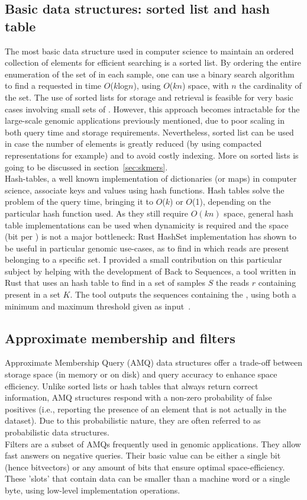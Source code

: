 \subsection{Basic data structures: sorted list and hash table}
The most basic data structure used in computer science to maintain an ordered collection of elements for efficient searching is a sorted list. By ordering the entire enumeration of the set of \kmers in each sample, one can use a binary search algorithm to find a requested \kmer in time $O$($k$log$n$), using $O$($kn$) space, with $n$ the cardinality of the set. The use of sorted lists for \kmer storage and retrieval is feasible for very basic cases involving small sets of \kmers. However, this approach becomes intractable for the large-scale genomic applications previously mentioned, due to poor scaling in both query time and storage requirements. Nevertheless, sorted list can be used in case the number of elements is greatly reduced (by using compacted \kmer representations for example) and to avoid costly indexing. More on sorted lists is going to be discussed in section~\ref{sec:skmers}.\\
Hash-tables, a well known implementation of dictionaries (or maps) in computer science, associate keys and values using hash functions. Hash tables solve the problem of the query time, bringing it to $O$($k$) or $O$(1), depending on the particular hash function used. As they still require $O(kn)$ space, general hash table implementations can be used when dynamicity is required and the space (bit per \kmer) is not a major bottleneck: Rust HashSet implementation has shown to be useful in particular genomic use-cases, as to find in which reads are present \kmers belonging to a specific set. I provided a small contribution on this particular subject by helping with the development of Back to Sequences, a tool written in Rust that uses an hash table to find in a set of samples $S$ the reads $r$ containing \kmers present in a set $K$. The tool outputs the sequences containing the \kmers, using both a minimum and maximum threshold given as input~\cite{back_to_sequences}.\\

\subsection{Approximate membership and filters}
Approximate Membership Query (AMQ) data structures offer a trade-off between storage space (in memory or on disk) and query accuracy to enhance space efficiency. Unlike sorted lists or hash tables that always return correct information, AMQ structures respond with a non-zero probability of false positives (i.e., reporting the presence of an element that is not actually in the dataset). Due to this probabilistic nature, they are often referred to as probabilistic data structures.\\
Filters are a subset of AMQs frequently used in genomic applications. They allow fast answers on negative queries. Their basic value can be either a single bit (hence bitvectors) or any amount of bits that ensure optimal space-efficiency. These 'slots' that contain data can be smaller than a machine word or a single byte, using low-level implementation operations.

